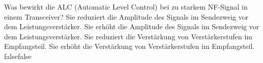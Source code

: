     {Was bewirkt die ALC (Automatic Level Control) bei zu starkem NF-Signal in einem Transceiver?}
    {Sie reduziert die Amplitude des Signals im Sendezweig vor dem Leistungsverstärker.}
    {Sie erhöht die Amplitude des Signals im Sendezweig vor dem Leistungsverstärker.}
    {Sie reduziert die Verstärkung von Verstärkerstufen im Empfangsteil.}
    {Sie erhöht die Verstärkung von Verstärkerstufen im Empfangsteil.}
    {false}{false}